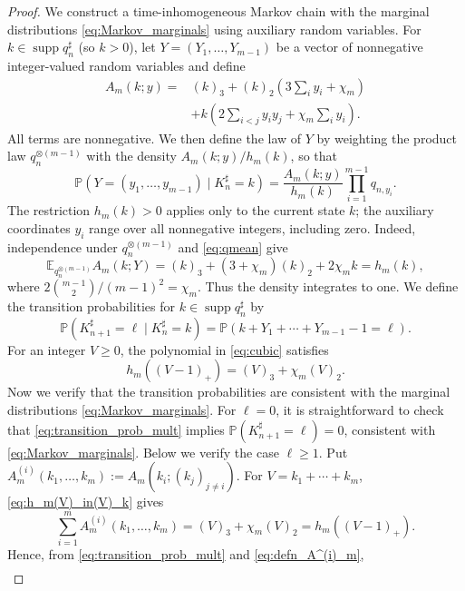 \documentclass[11pt,letterpaper,reqno]{amsart}
\numberwithin{equation}{section}
\theoremstyle{plain}
\theoremstyle{remark}
\newcommand{\E}{\mathbb E}\newcommand{\Pp}{\mathbb P}
\DeclareMathOperator{\supp}{supp}
\begin{document}
\begin{proof}
We construct a time-inhomogeneous Markov chain with the marginal distributions \eqref{eq:Markov_marginals} using auxiliary random variables. For $k\in\supp q_n^\sharp$ (so $k>0$), let $Y=(Y_1,\ldots,Y_{m-1})$ be a vector of nonnegative integer-valued random variables and define
\begin{align*}
 A_m(k;y)={}&(k)_3+(k)_2\left(3\sum_i y_i+\chi_m\right)\\
 &+k\left(2\sum_{i<j}y_iy_j+\chi_m\sum_i y_i\right).
\end{align*}
All terms are nonnegative. We then define the law of $Y$ by weighting the product law $q_n^{\otimes(m-1)}$ with the density $A_m(k;y)/h_m(k)$, so that
\[ 
 \Pp(Y = (y_1, \dotsc, y_{m - 1}) \mid K^{\sharp}_n = k) = \frac{A_m(k;y)}{h_m(k)} \prod^{m - 1}_{i = 1} q_{n, y_{i}}.
 \]
The restriction $h_m(k)>0$ applies only to the current state $k$; the auxiliary coordinates $y_i$ range over all nonnegative integers, including zero.
Indeed, independence under $q_n^{\otimes(m-1)}$ and \eqref{eq:qmean} give
\[
 \E_{q_n^{\otimes(m-1)}} A_m(k;Y)
 =(k)_3+(3+\chi_m)(k)_2+2\chi_m k=h_m(k),
\]
where $2\binom{m-1}{2}/(m-1)^2=\chi_m$. Thus the density integrates to one. We define the transition probabilities for $k\in\supp q_n^\sharp$ by
\begin{equation} \label{eq:transition_prob_mult}
 \Pp(K^{\sharp}_{n+1} = \ell \mid K^{\sharp}_n = k) = \Pp(k+Y_1+\cdots+Y_{m-1}-1=\ell).
\end{equation}
For an integer $V\ge0$, the polynomial in \eqref{eq:cubic} satisfies
\begin{equation}\label{eq:h_m(V)_in(V)_k}
 h_m((V-1)_+)=(V)_3+\chi_m(V)_2.
\end{equation}
Now we verify that the transition probabilities are consistent with the marginal distributions \eqref{eq:Markov_marginals}. For $\ell = 0$, it is straightforward to check that \eqref{eq:transition_prob_mult} implies $\Pp(K^{\sharp}_{n + 1} = \ell) = 0$, consistent with \eqref{eq:Markov_marginals}. Below we verify the case $\ell\ge1$. Put $A_m^{(i)}(k_1,\ldots,k_m):=A_m(k_i;(k_j)_{j\ne i})$. For $V=k_1+\cdots+k_m$, \eqref{eq:h_m(V)_in(V)_k} gives
\begin{equation} \label{eq:defn_A^(i)_m}
 \sum_{i=1}^m A^{(i)}_m(k_1, \dotsc, k_m) = (V)_3 + \chi_m (V)_2 = h_m((V-1)_+).
\end{equation}
Hence, from \eqref{eq:transition_prob_mult} and \eqref{eq:defn_A^(i)_m},
\begin{equation*}
\begin{split}

\end{split}
\end{equation*}
\end{proof}
\end{document}
